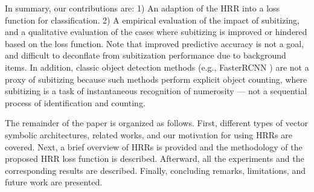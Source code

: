 \documentclass[letterpaper]{article} %
\begin{document}
\par
In summary, our contributions are: 1) An adaption of the HRR into a loss function for classification. 2) A empirical evaluation of the impact of subitizing, and a qualitative evaluation of the cases where subitizing is improved or hindered based on the loss function. Note that improved predictive accuracy is not a goal, and difficult to deconflate from subitization performance due to background items. In addition, classic object detection methods (e.g., FasterRCNN \cite{ren2015faster}) are not a proxy of subitizing because such methods perform explicit object counting, where subitizing is a task of instantaneous recognition of numerosity --- not a sequential process of identification and counting.
\par 
The remainder of the paper is organized as follows. First, different types of vector symbolic architectures, related works, and our motivation for using HRRs are covered. Next, a brief overview of HRRs is provided and the methodology of the proposed HRR loss function is described. Afterward, all the experiments and the corresponding results are described. Finally, concluding remarks, limitations, and future work are presented.
\end{document}
